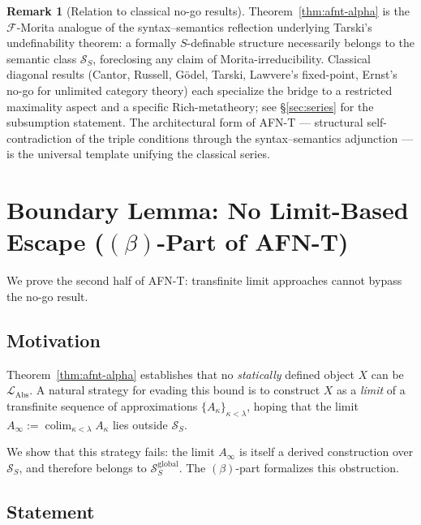 \documentclass[11pt]{article}
\theoremstyle{plain}
\theoremstyle{definition}
\newtheorem{remark}[theorem]{Remark}
\newcommand{\cS}{\mathcal{S}}
\newcommand{\cF}{\mathcal{F}}
\newcommand{\LAbs}{\mathcal{L}_{\mathrm{Abs}}}
\DeclareMathOperator{\colim}{colim}
\begin{document}
\begin{remark}[Relation to classical no-go results]\label{rem:classical-nogo}
Theorem~\ref{thm:afnt-alpha} is the $\cF$-Morita analogue of the syntax--semantics reflection underlying Tarski's undefinability theorem: a formally $S$-definable structure necessarily belongs to the semantic class $\cS_S$, foreclosing any claim of Morita-irreducibility. Classical diagonal results (Cantor, Russell, G\"odel, Tarski, Lawvere's fixed-point, Ernst's no-go for unlimited category theory) each specialize the bridge to a restricted maximality aspect and a specific Rich-metatheory; see \S\ref{sec:series} for the subsumption statement. The architectural form of AFN-T --- structural self-contradiction of the triple conditions through the syntax--semantics adjunction --- is the universal template unifying the classical series.
\end{remark}

\section{\texorpdfstring{Boundary Lemma: No Limit-Based Escape ($(\beta)$-Part of AFN-T)}{Boundary Lemma: No Limit-Based Escape ((beta)-Part of AFN-T)}}\label{sec:afnt-beta}

We prove the second half of AFN-T: transfinite limit approaches cannot bypass the no-go result.

\subsection{Motivation}

Theorem~\ref{thm:afnt-alpha} establishes that no \emph{statically} defined object $X$ can be $\LAbs$. A natural strategy for evading this bound is to construct $X$ as a \emph{limit} of a transfinite sequence of approximations $\{A_\kappa\}_{\kappa < \lambda}$, hoping that the limit $A_\infty := \colim_{\kappa < \lambda} A_\kappa$ lies outside $\cS_S$.

We show that this strategy fails: the limit $A_\infty$ is itself a derived construction over $\cS_S$, and therefore belongs to $\cS_S^{\mathrm{global}}$. The $(\beta)$-part formalizes this obstruction.

\subsection{Statement}
\end{document}
